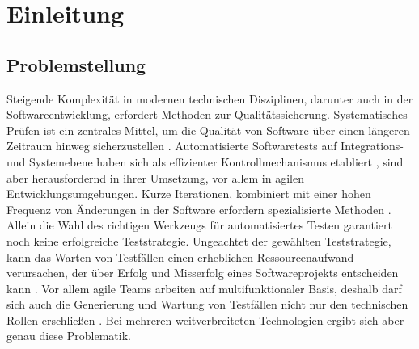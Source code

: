 \chapter{Einleitung}
\label{sec:introduction}

\section{Problemstellung}
\glsresetall
Steigende Komplexität in modernen technischen Disziplinen, darunter auch in der Softwareentwicklung, erfordert Methoden zur Qualitätssicherung. Systematisches Prüfen ist ein zentrales Mittel, um die Qualität von Software über einen längeren Zeitraum hinweg sicherzustellen \cite{spillner_software_2014}. Automatisierte Softwaretests auf Integrations- und Systemebene haben sich als effizienter Kontrollmechanismus etabliert \cite{dustin_software_2000}, sind aber herausfordernd in ihrer Umsetzung, vor allem in agilen Entwicklungsumgebungen. Kurze Iterationen, kombiniert mit einer hohen Frequenz von Änderungen in der Software erfordern spezialisierte Methoden \cite{linz_testing_2014}. Allein die Wahl des richtigen Werkzeugs für automatisiertes Testen garantiert noch keine erfolgreiche Teststrategie. Ungeachtet der gewählten Teststrategie, kann das Warten von Testfällen einen erheblichen Ressourcenaufwand verursachen, der über Erfolg und Misserfolg eines Softwareprojekts entscheiden kann \cite{dustin_software_2000}. Vor allem agile Teams arbeiten auf multifunktionaler Basis, deshalb darf sich auch die Generierung und Wartung von Testfällen nicht nur den technischen Rollen erschließen \cite{linz_testing_2014}. Bei mehreren weitverbreiteten Technologien ergibt sich aber genau diese Problematik.\\

